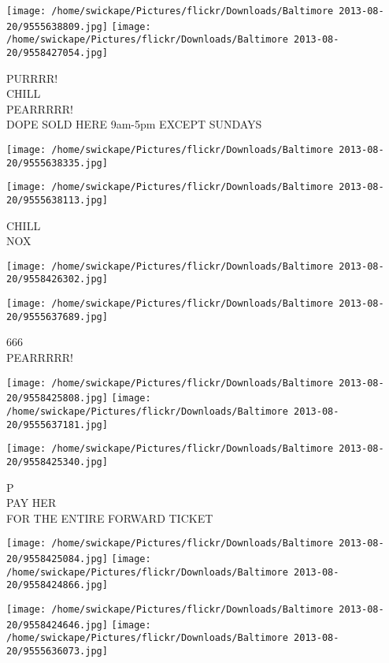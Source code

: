 \documentclass[10pt,letterpaper]{article}
\begin{document}
\texttt{[image: /home/swickape/Pictures/flickr/Downloads/Baltimore 2013-08-20/9555638809.jpg]}
\texttt{[image: /home/swickape/Pictures/flickr/Downloads/Baltimore 2013-08-20/9558427054.jpg]}

PURRRR!\\
CHILL\\
PEARRRRR!\\
DOPE SOLD HERE 9am{-}5pm EXCEPT SUNDAYS\\
\pagebreak

\texttt{[image: /home/swickape/Pictures/flickr/Downloads/Baltimore 2013-08-20/9555638335.jpg]}

\vspace{0.25in}
\texttt{[image: /home/swickape/Pictures/flickr/Downloads/Baltimore 2013-08-20/9555638113.jpg]}

CHILL\\
NOX\\
\pagebreak

\texttt{[image: /home/swickape/Pictures/flickr/Downloads/Baltimore 2013-08-20/9558426302.jpg]}

\vspace{0.25in}
\texttt{[image: /home/swickape/Pictures/flickr/Downloads/Baltimore 2013-08-20/9555637689.jpg]}

666\\
PEARRRRR!\\
\pagebreak

\texttt{[image: /home/swickape/Pictures/flickr/Downloads/Baltimore 2013-08-20/9558425808.jpg]}
\texttt{[image: /home/swickape/Pictures/flickr/Downloads/Baltimore 2013-08-20/9555637181.jpg]}

\vspace{0.25in}
\texttt{[image: /home/swickape/Pictures/flickr/Downloads/Baltimore 2013-08-20/9558425340.jpg]}

P\\
PAY HER\\
FOR THE ENTIRE FORWARD TICKET\\
\pagebreak

\texttt{[image: /home/swickape/Pictures/flickr/Downloads/Baltimore 2013-08-20/9558425084.jpg]}
\texttt{[image: /home/swickape/Pictures/flickr/Downloads/Baltimore 2013-08-20/9558424866.jpg]}

\texttt{[image: /home/swickape/Pictures/flickr/Downloads/Baltimore 2013-08-20/9558424646.jpg]}
\texttt{[image: /home/swickape/Pictures/flickr/Downloads/Baltimore 2013-08-20/9555636073.jpg]}
\end{document}
